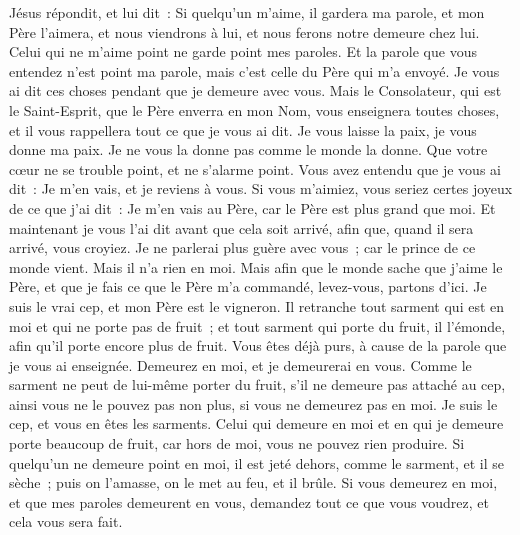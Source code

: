 \begin{multicols}{2}
Jésus répondit, et lui dit~: Si quelqu'un m'aime, il gardera ma parole, et mon Père l'aimera, et nous viendrons à lui, et nous ferons notre demeure chez lui.
Celui qui ne m'aime point ne garde point mes paroles. Et la parole que vous entendez n'est point ma parole, mais c'est celle du Père qui m'a envoyé.
Je vous ai dit ces choses pendant que je demeure avec vous.
Mais le Consolateur, qui est le Saint-Esprit, que le Père enverra en mon Nom, vous enseignera toutes choses, et il vous rappellera tout ce que je vous ai dit.
Je vous laisse la paix, je vous donne ma paix. Je ne vous la donne pas comme le monde la donne. Que votre cœur ne se trouble point, et ne s'alarme point.
Vous avez entendu que je vous ai dit~: Je m'en vais, et je reviens à vous. Si vous m'aimiez, vous seriez certes joyeux de ce que j'ai dit~: Je m'en vais au Père, car le Père est plus grand que moi.
Et maintenant je vous l'ai dit avant que cela soit arrivé, afin que, quand il sera arrivé, vous croyiez.
Je ne parlerai plus guère avec vous~; car le prince de ce monde vient. Mais il n'a rien en moi.
Mais afin que le monde sache que j'aime le Père, et que je fais ce que le Père m'a commandé, levez-vous, partons d'ici.
\VerseOne{}Je suis le vrai cep, et mon Père est le vigneron.
Il retranche tout sarment qui est en moi et qui ne porte pas de fruit~; et tout sarment qui porte du fruit, il l'émonde, afin qu'il porte encore plus de fruit.
Vous êtes déjà purs, à cause de la parole que je vous ai enseignée.
Demeurez en moi, et je demeurerai en vous. Comme le sarment ne peut de lui-même porter du fruit, s'il ne demeure pas attaché au cep, ainsi vous ne le pouvez pas non plus, si vous ne demeurez pas en moi.
Je suis le cep, et vous en êtes les sarments. Celui qui demeure en moi et en qui je demeure porte beaucoup de fruit, car hors de moi, vous ne pouvez rien produire.
Si quelqu'un ne demeure point en moi, il est jeté dehors, comme le sarment, et il se sèche~; puis on l'amasse, on le met au feu, et il brûle.
Si vous demeurez en moi, et que mes paroles demeurent en vous, demandez tout ce que vous voudrez, et cela vous sera fait.

\end{multicols}
